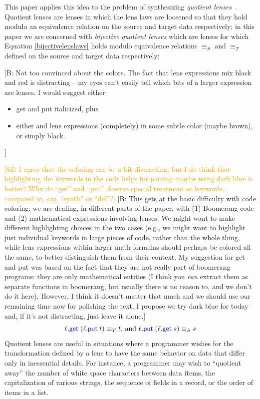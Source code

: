 \documentclass[acmsmall,screen]{acmart}
\newcommand{\FINISH}[3]{\ifdraft\textcolor{#1}{[#2: #3]}\fi}
\newcommand{\bcp}[1]{\FINISH{dkred}{B}{#1}}
\newcommand{\saz}[1]{\FINISH{orange}{SZ}{#1}}
\newcommand{\kw}[1]{\textcolor{dkblue}{\ensuremath{\mathsf{#1}}}}
\newcommand{\get}{\ensuremath{\kw{get}}}
\newcommand{\lput}{\ensuremath{\kw{put}}}
\begin{document}
This paper applies this idea to the problem of
synthesizing {\em quotient lenses}~\cite{quotientlenses}.
Quotient lenses are lenses in which the lens laws are
loosened so that they hold modulo an equivalence relation on the source and
target data respectively; in this paper we are concerned with {\em bijective
quotient lenses} which are lenses for which Equation \ref{bijectivelenslaws}
holds modulo equivalence relations $\equiv_S$ and $\equiv_T$ defined on the source
and target data respectively:
\iflater
\bcp{Not too convinced about the colors.  The
  fact that lens expressions mix black and red is distracting -- my eyes
  can't easily tell which bits of a larger expression are lenses.  I would
  suggest either:
  \begin{itemize}
  \item get and put italicized, plus
  \item either and lens expressions (completely) in some subtle color (maybe
  brown), or simply black.
  \end{itemize}
}\saz{I agree that the coloring can be a bit distracting, but I do think that
  highlighting the keywords in the code helps for parsing--maybe using dark blue
  is better? Why do ``get'' and ``put'' deserve special treatment as keywords,
  compared to, say, ``synth'' or ``del''?}
%
\bcp{This gets at the basic difficulty with code coloring: we are dealing,
  in different parts of the paper, with (1) Boomerang code and (2)
  mathematical expressions involving lenses. We might want to make different
  highlighting choices in the two cases (e.g., we might want to highlight
  just individual keywords in large pieces of code, rather than the whole
  thing, while lens expressions within larger math formulas should perhaps
  be colored all the same, to better distinguish them from their context.
  My suggestion for get and put was based on the fact that they are not
  really part of boomerang programs: they are only mathematical entities (I
  think you {\em can} extract them as separate functions in boomerang, but
  usually there is no reason to, and we don't do it here).  However, I think
  it doesn't matter that much and we should use our remaining time now for
  polishing the text.  I propose we try dark blue for today and, if it's not
  distracting, just leave it alone.}
%
\fi
\begin{equation}\label{quotientlenslaws}
\ell.\get \; (\ell.\lput \; t) \equiv_T t \text{, and } \ell.\lput \; (\ell.\get
\; s) \equiv_S s
\end{equation}
Quotient lenses are useful in situations where a programmer wishes for the
transformation defined by a lens to have the same behavior on data that differ
only in inessential details. For instance, a programmer may wish to ``quotient
away'' the number of white space characters between data items, the
capitalization of various strings, the sequence of fields in a record, or the
order of items in a list.
\end{document}
